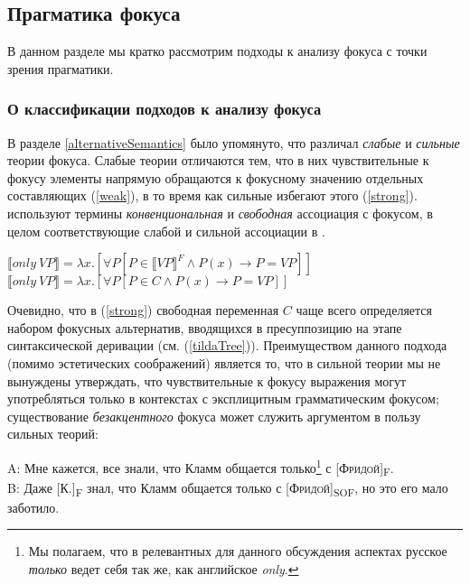 \documentclass[a4paper, titlepage, 12pt]{article}
\begin{document}
\subsection{Прагматика фокуса}\label{focusPragmatics}

В данном разделе мы кратко рассмотрим подходы к анализу фокуса с точки зрения прагматики.

\subsubsection{О классификации подходов к анализу фокуса} \label{focusApproaches}

В разделе \ref{alternativeSemantics} было упомянуто, что \citep{rooth1992theory} различал \textit{слабые} и \textit{сильные} теории фокуса. Слабые теории \citep{rooth1985association} отличаются тем, что в них чувствительные к фокусу элементы напрямую обращаются к фокусному значению отдельных составляющих (\ref{weak}), в то время как сильные \citep{rooth1992theory} избегают этого (\ref{strong}). \citep{beaver2008sense} используют термины \textit{конвенциональная} и \textit{свободная} ассоциация с фокусом, в целом соответствующие слабой и сильной ассоциации в \citep{rooth1992theory}.

\begin{exe}
    \ex \begin{xlist}
        \ex \label{weak} $ \llbracket only\ V\!P \rrbracket = \lambda x.[\forall P [P \in \llbracket V\!P \rrbracket^{F} \land P(x) \rightarrow P = V\!P]] $
        \ex \label{strong} $ \llbracket only\ V\!P \rrbracket = \lambda x.[\forall P [P \in C \land P(x) \rightarrow P = V\!P ]] $
    \end{xlist}
\end{exe}

Очевидно, что в (\ref{strong}) свободная переменная $ C $ чаще всего определяется набором фокусных альтернатив, вводящихся в пресуппозицию на этапе синтаксической деривации (см. (\ref{tildaTree})). Преимуществом данного подхода (помимо эстетических соображений) является то, что в сильной теории мы не вынуждены утверждать, что чувствительные к фокусу выражения могут употребляться только в контекстах с эксплицитным грамматическим фокусом; существование \textit{безакцентного} фокуса может служить аргументом в пользу сильных теорий:

\begin{exe}
    \ex A: Мне кажется, все знали, что Кламм общается только\footnote{Мы полагаем, что в релевантных для данного обсуждения аспектах русское \textit{только} ведет себя так же, как английское \textit{only}.} с [\textsc{Фридой}]\textsubscript{F}. \\
        B: Даже [\textsc{К.}]\textsubscript{F} знал, что Кламм общается только с [\textsc{Фридой}]\textsubscript{SOF}, но это его мало заботило.
\end{exe}
\end{document}
